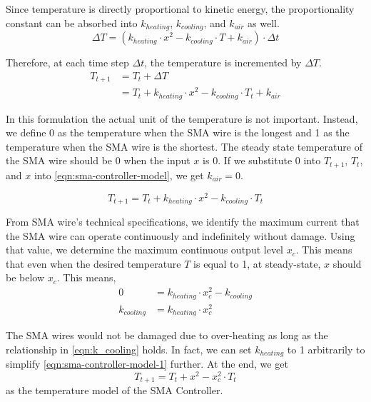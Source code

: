 Since temperature is directly proportional to kinetic energy, the proportionality constant can be absorbed into $k_{heating}$, $k_{cooling}$, and $ k_{air}$ as well. 
\begin{equation}
	\Delta T =  (k_{heating} \cdot x^2 - k_{cooling} \cdot T  + k_{air}) \cdot \Delta t\label{eqn:delta_T}
\end{equation}

Therefore, at each time step $\Delta t$, the temperature is incremented by $\Delta T$.  
\begin{subequations}
	\begin{flalign}
	T_{t+1} &=  T_{t} + \Delta T \\
		    &=  T_{t} + k_{heating} \cdot x^2 - k_{cooling} \cdot T_{t}  + k_{air}\label{eqn:sma-controller-model}
	\end{flalign}
\end{subequations}

In this formulation the actual unit of the temperature is not important. Instead, we define 0 as the temperature when the SMA wire is the longest and 1 as the temperature when the SMA wire is the shortest. The steady state temperature of the SMA wire should be 0 when the input $x$ is 0. If we substitute 0 into $T_{t+1}$, $T_{t}$, and $x$ into \eqref{eqn:sma-controller-model}, we get $k_{air} = 0$. 

\begin{equation}\label{eqn:sma-controller-model-1}
T_{t+1} =  T_{t} + k_{heating} \cdot x^2 - k_{cooling} \cdot T_{t}
\end{equation}

From SMA wire's technical specifications\cite{FlexinolTechSpecs}, we identify the maximum current that the SMA wire can operate continuously and indefinitely without damage. Using that value, we determine the maximum continuous output level $x_c$. This means that even when the desired temperature $T$ is equal to 1, at steady-state, $x$ should be below $x_c$. This means, 
\begin{subequations}
	\begin{flalign}
	 0 &= k_{heating} \cdot x_c^2 - k_{cooling} \\
	 k_{cooling} &=  k_{heating} \cdot x_c^2\label{eqn:k_cooling}
	\end{flalign}
\end{subequations}

The SMA wires would not be damaged due to over-heating as long as the relationship in \eqref{eqn:k_cooling} holds. In fact, we can set $k_{heating}$ to 1 arbitrarily to simplify \eqref{eqn:sma-controller-model-1} further. At the end, we get
\begin{equation}\label{eqn:sma-controller-model-2}
	T_{t+1} =  T_{t} + x^2 -  x_c^2 \cdot T_{t}
\end{equation}
as the temperature model of the SMA Controller.

